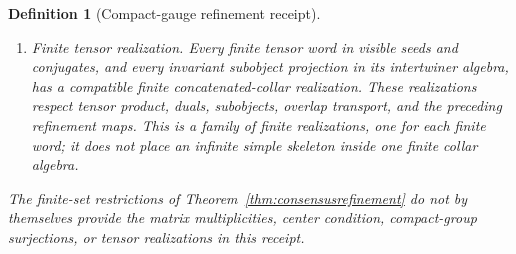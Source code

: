 \documentclass[11pt]{article}
\newtheorem{definition}[theorem]{Definition}
\begin{document}
\begin{definition}[Compact-gauge refinement receipt]
\begin{enumerate}
\[\qquad
\pi_{rr}^{\Sigma}=\mathrm{id},qquad
\pi_{tr}^{\Sigma}=\pi_{sr}^{\Sigma}\circ\pi_{ts}^{\Sigma},
\]
together with one common stagewise strict representative \(U^{\mathrm{str}}_r\) at every
\(r\in R_0\). The maps intertwine overlap transport and these common choices, including the
chosen central or crossed-module strictification where applicable and the represented action of
every closed overlap loop; the representative is not changed object by object. In particular,
closed fine loops with trivial coarse shadow must act trivially rather than create new residual
holonomy. For every visible seed carrier
\(W_{\alpha,r}\), its pullback \((\pi_{sr}^{\Sigma})^*W_{\alpha,r}\) lies in
\(\mathsf{Sect}^{\mathrm{bos}}_s\), and its chosen refined collar realization has support
\(\jmath_{rs}^{B}(P_{\alpha,r})\). Fine central blocks under that support are realization blocks
of the same pulled-back charge; they do not define a categorical direct sum with a larger carrier.
\item \emph{Finite tensor realization.} Every finite tensor word in visible seeds and conjugates,
and every invariant subobject projection in its intertwiner algebra, has a compatible finite
concatenated-collar realization. These realizations respect tensor product, duals, subobjects,
overlap transport, and the preceding refinement maps. This is a family of finite realizations,
one for each finite word; it does not place an infinite simple skeleton inside one finite collar
algebra.
\end{enumerate}
The finite-set restrictions of Theorem~\ref{thm:consensusrefinement} do not by themselves provide
the matrix multiplicities, center condition, compact-group surjections, or tensor realizations in
this receipt.
\end{definition}
\end{document}
